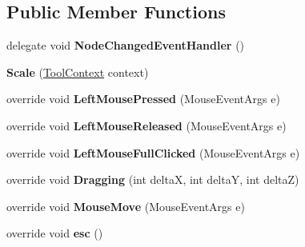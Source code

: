 \subsection*{Public Member Functions}
\begin{DoxyCompactItemize}
\item 
\hypertarget{class_interface_graphique_1_1_tools_1_1_scale_ac1db83864b0144e9227e48bd51ac490d}{}delegate void {\bfseries Node\+Changed\+Event\+Handler} ()\label{class_interface_graphique_1_1_tools_1_1_scale_ac1db83864b0144e9227e48bd51ac490d}

\item 
\hypertarget{class_interface_graphique_1_1_tools_1_1_scale_adc4fab6ae3be7af401e10d5ab2c9c449}{}{\bfseries Scale} (\hyperlink{class_interface_graphique_1_1_tools_1_1_tool_context}{Tool\+Context} context)\label{class_interface_graphique_1_1_tools_1_1_scale_adc4fab6ae3be7af401e10d5ab2c9c449}

\item 
\hypertarget{class_interface_graphique_1_1_tools_1_1_scale_a25847a69fbbb90869af28ad831fbee9a}{}override void {\bfseries Left\+Mouse\+Pressed} (Mouse\+Event\+Args e)\label{class_interface_graphique_1_1_tools_1_1_scale_a25847a69fbbb90869af28ad831fbee9a}

\item 
\hypertarget{class_interface_graphique_1_1_tools_1_1_scale_a5ab44f398247a5a1e79523372f2aa639}{}override void {\bfseries Left\+Mouse\+Released} (Mouse\+Event\+Args e)\label{class_interface_graphique_1_1_tools_1_1_scale_a5ab44f398247a5a1e79523372f2aa639}

\item 
\hypertarget{class_interface_graphique_1_1_tools_1_1_scale_a46260c1876745b5b09c73f69235d35fc}{}override void {\bfseries Left\+Mouse\+Full\+Clicked} (Mouse\+Event\+Args e)\label{class_interface_graphique_1_1_tools_1_1_scale_a46260c1876745b5b09c73f69235d35fc}

\item 
\hypertarget{class_interface_graphique_1_1_tools_1_1_scale_acf2e415f052d5145b5f80b2fea0993cb}{}override void {\bfseries Dragging} (int delta\+X, int delta\+Y, int delta\+Z)\label{class_interface_graphique_1_1_tools_1_1_scale_acf2e415f052d5145b5f80b2fea0993cb}

\item 
\hypertarget{class_interface_graphique_1_1_tools_1_1_scale_aac4bb7da59fdb782e8ac30fb10324398}{}override void {\bfseries Mouse\+Move} (Mouse\+Event\+Args e)\label{class_interface_graphique_1_1_tools_1_1_scale_aac4bb7da59fdb782e8ac30fb10324398}

\item 
\hypertarget{class_interface_graphique_1_1_tools_1_1_scale_a017877e628f6a5f5a0385d0516831adc}{}override void {\bfseries esc} ()\label{class_interface_graphique_1_1_tools_1_1_scale_a017877e628f6a5f5a0385d0516831adc}

\end{DoxyCompactItemize}
